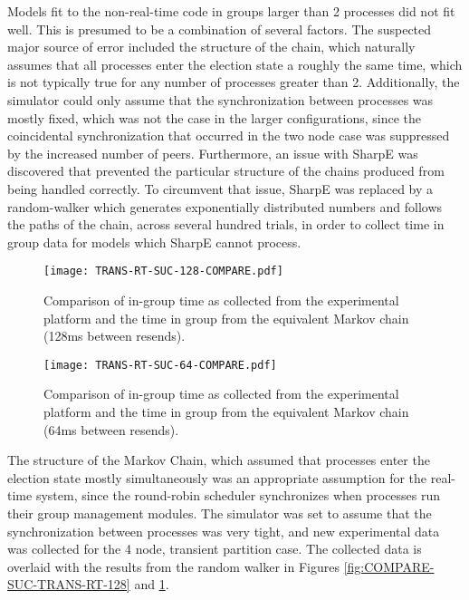 Models fit to the non-real-time code in groups larger than 2 processes did not fit well.
This is presumed to be a combination of several factors. The suspected major source of error
included the structure of the chain, which naturally assumes that all processes enter the
election state a roughly the same time, which is not typically true for any number of processes
greater than 2. Additionally, the simulator could only assume that the synchronization between
processes was mostly fixed, which was not the case in the larger configurations, since the
coincidental synchronization that occurred in the two node case was suppressed by the increased
number of peers. Furthermore, an issue with SharpE was discovered that prevented the
particular structure of the chains produced from being handled correctly. To circumvent that
issue, SharpE was replaced by a random-walker which generates exponentially distributed numbers
and follows the paths of the chain, across several hundred trials, in order to collect time in group data for
models which SharpE cannot process.

\begin{figure}
\centering
\begin{minipage}{0.45\textwidth}
    \centering
    \texttt{[image: TRANS-RT-SUC-128-COMPARE.pdf]}
    \caption{Comparison of in-group time as collected from the experimental platform and the time in group from the equivalent Markov chain (128ms between resends).}
    \label{fig:COMPARE-SUC-TRANS-RT-128}
\end{minipage}%
\qquad
\begin{minipage}{0.45\textwidth}
    \centering
    \texttt{[image: TRANS-RT-SUC-64-COMPARE.pdf]}
    \caption{Comparison of in-group time as collected from the experimental platform and the time in group from the equivalent Markov chain (64ms between resends).}
    \label{fig:COMPARE-SUC-TRANS-RT-64}
\end{minipage}
\end{figure}

The structure of the Markov Chain, which assumed that processes enter the election state
mostly simultaneously was an appropriate assumption for the real-time system, since the
round-robin scheduler synchronizes when processes run their group management modules. The
simulator was set to assume that the synchronization between processes was very tight, and
new experimental data was collected for the 4 node, transient partition case. The collected
data is overlaid with the results from the random walker in Figures \ref{fig:COMPARE-SUC-TRANS-RT-128} and \ref{fig:COMPARE-SUC-TRANS-RT-64}.

